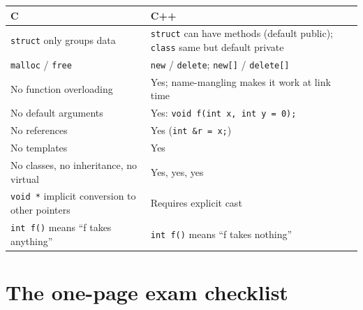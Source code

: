 \documentclass[11pt,a4paper]{article}
\begin{document}
\begin{center}
\begin{tabular}{p{6cm}p{8.5cm}}
\hline
\textbf{C} & \textbf{C++} \\
\hline
\verb|struct| only groups data & \verb|struct| can have methods (default public); \verb|class| same but default private \\
\verb|malloc| / \verb|free| & \verb|new| / \verb|delete|; \verb|new[]| / \verb|delete[]| \\
No function overloading & Yes; name-mangling makes it work at link time \\
No default arguments & Yes: \verb|void f(int x, int y = 0);| \\
No references & Yes (\verb|int &r = x;|) \\
No templates & Yes \\
No classes, no inheritance, no virtual & Yes, yes, yes \\
\verb|void *| implicit conversion to other pointers & Requires explicit cast \\
\verb|int f()| means ``f takes anything'' & \verb|int f()| means ``f takes nothing'' \\
\hline
\end{tabular}
\end{center}

\hrulefill

\section{The one-page exam checklist}
\end{document}
